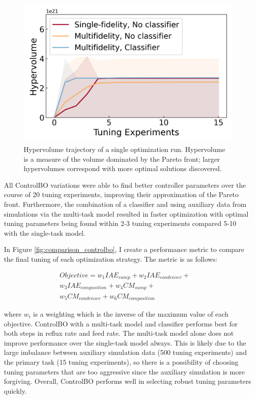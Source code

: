 \begin{figure}
    \centering
    \includegraphics[width=\textwidth]{gfx/Chapter06/hypervolume_comparison.png}
    \caption{Hypervolume trajectory of a single optimization run. Hypervolume is a measure of the volume dominated by the Pareto front; larger hypervolumes correspond with more optimal solutions discovered.}
    \label{fig:hypervolume_comparison}
\end{figure}

All ControlBO variations were able to find better controller parameters over the course of 20 tuning experiments, improving their approximation of the Pareto front. Furthermore, the combination of a classifier and using auxiliary data from simulations via the multi-task model resulted in faster optimization with optimal tuning parameters being found within 2-3 tuning experiments compared 5-10 with the single-task model. 

In Figure \ref{fig:comparison_controlbo}, I create a performance metric to compare the final tuning of each optimization strategy. The metric is as follows:  

\begin{equation}
\begin{split}
    Objective = w_1 IAE_{sump} + w_2 IAE_{condenser} +  & \\ w_3 IAE_{composition} +  w_4 CM_{sump} + & \\  w_5 CM_{condenser} + w_6 CM_{composition}
\end{split}
\end{equation}

where $w_i$ is a weighting which is the inverse of the maximum value of each objective. ControlBO with a multi-task model and classifier performs best for both steps in reflux rate and feed rate. The multi-task model alone does not improve performance over the single-task model always. This is likely due to the large imbalance between auxiliary simulation data (500 tuning experiments) and the primary task (15 tuning experiments), so there is a possibility of choosing tuning parameters that are too aggressive since the auxiliary simulation is more forgiving. Overall, ControlBO performs well in selecting robust tuning parameters quickly.

